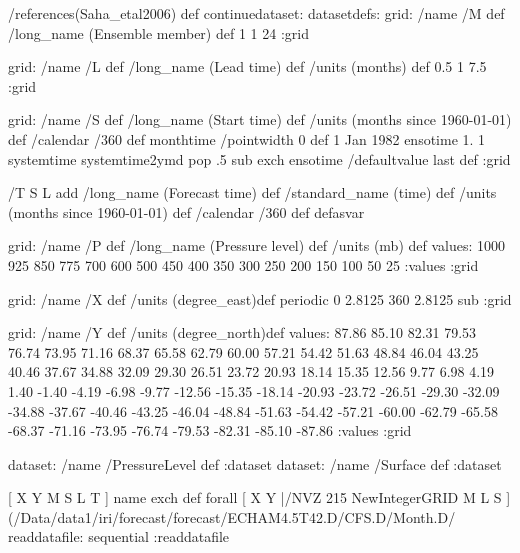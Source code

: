 \begin{ingrid}
/references(Saha_etal2006) def 
continuedataset:
datasetdefs:
grid:
/name /M def
/long_name (Ensemble member) def
1 1 24
:grid

grid:
/name /L def
/long_name (Lead time) def
/units (months) def
0.5 1 7.5
:grid

grid:
/name /S def
/long_name (Start time) def
/units (months since 1960-01-01) def
/calendar /360 def
monthtime
/pointwidth 0 def 
1 Jan 1982 ensotime
1.
1 systemtime
systemtime2ymd pop .5 sub exch
ensotime
/defaultvalue {last} def
:grid

/T { 
S L add
/long_name (Forecast time) def
/standard_name (time) def
/units (months since 1960-01-01) def
/calendar /360 def
 }defasvar


grid:
/name /P def
/long_name (Pressure level) def
/units (mb) def
values: 
1000 925 850 775 700 600 500 450 400 350 300 250 200 150 100 50 25
:values
:grid

grid:
/name /X def
/units (degree_east)def
 periodic
 0 2.8125 360  2.8125 sub
:grid

grid:
/name /Y def
/units (degree_north)def
values:
87.86 85.10 82.31 79.53 76.74 73.95 71.16 68.37
 65.58 62.79 60.00 57.21 54.42 51.63 48.84 46.04 43.25 40.46
 37.67 34.88 32.09 29.30 26.51 23.72 20.93 18.14 15.35 12.56
 9.77  6.98  4.19  1.40   -1.40   -4.19   -6.98   -9.77  -12.56  -15.35
 -18.14  -20.93  -23.72  -26.51  -29.30  -32.09  -34.88  -37.67  -40.46  -43.25
 -46.04  -48.84  -51.63  -54.42  -57.21  -60.00  -62.79  -65.58  -68.37  -71.16
 -73.95  -76.74  -79.53  -82.31  -85.10  -87.86
:values
:grid

dataset: /name /PressureLevel def :dataset
dataset: /name /Surface def :dataset


[ X Y M S L T ] { name exch def } forall
[ X Y |/NVZ 215  NewIntegerGRID M L S ]
(/Data/data1/iri/forecast/forecast/ECHAM4.5T42.D/CFS.D/Month.D/%
readdatafile:
sequential
:readdatafile


\end{ingrid}
